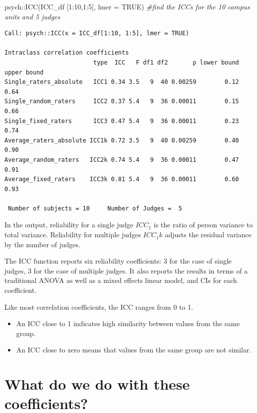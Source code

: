 \documentclass[
  english,
]{book}
\newenvironment{Shaded}{\begin{snugshade}}{\end{snugshade}}
\newcommand{\AttributeTok}[1]{\textcolor[rgb]{0.77,0.63,0.00}{#1}}
\newcommand{\CommentTok}[1]{\textcolor[rgb]{0.56,0.35,0.01}{\textit{#1}}}
\newcommand{\ConstantTok}[1]{\textcolor[rgb]{0.00,0.00,0.00}{#1}}
\newcommand{\DecValTok}[1]{\textcolor[rgb]{0.00,0.00,0.81}{#1}}
\newcommand{\FunctionTok}[1]{\textcolor[rgb]{0.00,0.00,0.00}{#1}}
\newcommand{\NormalTok}[1]{#1}
\newcommand{\SpecialCharTok}[1]{\textcolor[rgb]{0.00,0.00,0.00}{#1}}
\providecommand{\tightlist}{%
  \setlength{\itemsep}{0pt}\setlength{\parskip}{0pt}}
\begin{document}
\begin{Shaded}
\begin{Highlighting}[]
\NormalTok{psych}\SpecialCharTok{::}\FunctionTok{ICC}\NormalTok{(ICC\_df [}\DecValTok{1}\SpecialCharTok{:}\DecValTok{10}\NormalTok{,}\DecValTok{1}\SpecialCharTok{:}\DecValTok{5}\NormalTok{], }\AttributeTok{lmer =} \ConstantTok{TRUE}\NormalTok{) }\CommentTok{\#find the ICCs for the 10 campus units and 5 judges}
\end{Highlighting}
\end{Shaded}

\begin{verbatim}
Call: psych::ICC(x = ICC_df[1:10, 1:5], lmer = TRUE)

Intraclass correlation coefficients 
                         type  ICC   F df1 df2       p lower bound upper bound
Single_raters_absolute   ICC1 0.34 3.5   9  40 0.00259        0.12        0.64
Single_random_raters     ICC2 0.37 5.4   9  36 0.00011        0.15        0.66
Single_fixed_raters      ICC3 0.47 5.4   9  36 0.00011        0.23        0.74
Average_raters_absolute ICC1k 0.72 3.5   9  40 0.00259        0.40        0.90
Average_random_raters   ICC2k 0.74 5.4   9  36 0.00011        0.47        0.91
Average_fixed_raters    ICC3k 0.81 5.4   9  36 0.00011        0.60        0.93

 Number of subjects = 10     Number of Judges =  5
\end{verbatim}

In the output, reliability for a single judge \(ICC_1\) is the ratio of person variance to total variance. Reliability for multiple judges \(ICC_1k\) adjusts the residual variance by the number of judges.

The ICC function reports six reliability coefficients: 3 for the case of single judges, 3 for the case of multiple judges. It also reports the results in terms of a traditional ANOVA as well as a mixed effects linear model, and CIs for each coefficient.

Like most correlation coefficients, the ICC ranges from 0 to 1.

\begin{itemize}
\tightlist
\item
  An ICC close to 1 indicates high similarity between values from the same group.
\item
  An ICC close to zero means that values from the same group are not similar.
\end{itemize}

\hypertarget{what-do-we-do-with-these-coefficients}{%
\section{What do we do with these coefficients?}\label{what-do-we-do-with-these-coefficients}}
\end{document}

